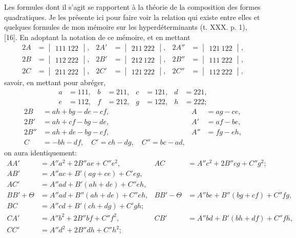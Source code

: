 \documentclass[11pt,a4paper]{book}
\begin{document}
Les formules dont il s'agit se rapportent \`{a} la th\'{e}orie de la composition des formes quadratiques. Je les pr\'{e}sente ici pour faire voir la relation qui existe entre elles et quelques formules de mon m\'{e}moire sur les hyperd\'{e}terminants (t. XXX. p. 1), [16]. En adoptant la notation de ce m\'{e}moire, et en mettant
\begin{align*}
2A &= \begin{vmatrix} 111 \ 122 \end{vmatrix}, & 2A' &= \begin{vmatrix} 211 \ 222 \end{vmatrix}, & 2A'' &= \begin{vmatrix} 121 \ 122 \end{vmatrix}, \\
2B &= \begin{vmatrix} 112 \ 222 \end{vmatrix}, & 2B' &= \begin{vmatrix} 212 \ 122 \end{vmatrix}, & 2B'' &= \begin{vmatrix} 111 \ 222 \end{vmatrix}, \\
2C &= \begin{vmatrix} 211 \ 222 \end{vmatrix}, & 2C' &= \begin{vmatrix} 121 \ 222 \end{vmatrix}, & 2C'' &= \begin{vmatrix} 112 \ 222 \end{vmatrix},
\end{align*}
savoir, en mettant pour abr\'{e}ger,
\begin{align*}
a &= 111, & b &= 211, & c &= 121, & d &= 221, \\
e &= 112, & f &= 212, & g &= 122, & h &= 222;
\end{align*}
\begin{align*}
2B &= ah + bg - de - cf, & A &= ag - ce, \\
2B' &= ah + cf - bg - de, & A' &= af - be, \\
2B'' &= ah + de - bg - cf, & A'' &= fg - eh, \\
C &= -bh - df, \quad C' = ch - dg, \quad C'' = bc - ad,
\end{align*}
on aura identiquement:
\begin{align}
\tag{1} AA' &= A''a^2 + 2B''ae + C''e^2, & AC &= A''c^2 + 2B''cg + C''g^2; \\
\tag{2} AB' &= A''ac + B'(ag + ce) + C'eg, & & \\
\tag{3} AC' &= A''ad + B'(ah + de) + C''eh, & & \\
\tag{4} BB' + \Theta &= A''ad + B''(ah + de) + C''eh, & BB' - \Theta &= A''be + B''(bg + cf) + C''fg, \\
\tag{5} BC &= A''cd + B'(ch + dg) + C'gh; & & \\
\tag{6} CA' &= A''b^2 + 2B''bf + C''f^2, & CB' &= A''bd + B'(bh + df) + C''fh, \\
\tag{7} CC' &= A''d^2 + 2B''dh + C''h^2; & &
\end{align}
\end{document}
